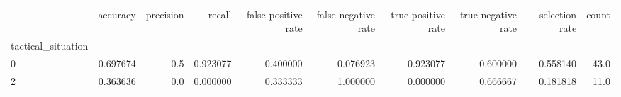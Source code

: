 \begin{tabular}{lrrrrrrrrr}
\toprule
{} &  accuracy &  precision &    recall &  false positive rate &  false negative rate &  true positive rate &  true negative rate &  selection rate &  count \\
tactical\_situation &           &            &           &                      &                      &                     &                     &                 &        \\
\midrule
0                  &  0.697674 &        0.5 &  0.923077 &             0.400000 &             0.076923 &            0.923077 &            0.600000 &        0.558140 &   43.0 \\
2                  &  0.363636 &        0.0 &  0.000000 &             0.333333 &             1.000000 &            0.000000 &            0.666667 &        0.181818 &   11.0 \\
\bottomrule
\end{tabular}
